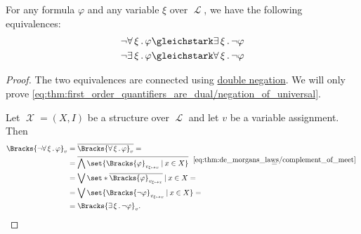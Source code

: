 \begin{proposition}\label{thm:first_order_quantifiers_are_dual}
  For any formula \( \varphi \) and any variable \( \xi \) over \( \mscrL \), we have the following equivalences:
  \begin{align}
    \neg \qforall \xi \varphi &\gleichstark \qexists \xi \neg \varphi \label{eq:thm:first_order_quantifiers_are_dual/negation_of_universal} \\
    \neg \qexists \xi \varphi &\gleichstark \qforall \xi \neg \varphi \label{eq:thm:first_order_quantifiers_are_dual/negation_of_existential}
  \end{align}
\end{proposition}
\begin{proof}
  The two equivalences are connected using \hyperref[thm:boolean_equivalences/double_negation]{double negation}. We will only prove \eqref{eq:thm:first_order_quantifiers_are_dual/negation_of_universal}.

  Let \( \mscrX = (X, I) \) be a structure over \( \mscrL \) and let \( v \) be a variable assignment. Then
  \begin{align*}
    \Bracks{ \neg \qforall \xi \varphi }_v
    &=
    \overline{\Bracks{ \qforall \xi \varphi }_v}
    = \\ &=
    \overline{\bigwedge\set{ \Bracks{\varphi}_{v_{\xi \mapsto x}} \given x \in X }}
    \reloset {\eqref{eq:thm:de_morgans_laws/complement_of_meet}} = \\ &=
    \bigvee\set*{ \overline{\Bracks{\varphi}_{v_{\xi \mapsto x}}} \given x \in X }
    = \\ &=
    \bigvee\set{ \Bracks{\neg \varphi}_{v_{\xi \mapsto x}} \given x \in X }
    = \\ &=
    \Bracks{\qexists \xi \neg \varphi}_v.
  \end{align*}
\end{proof}


